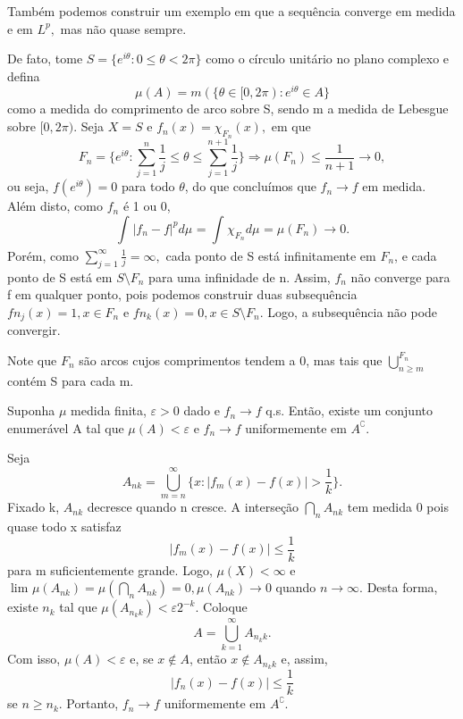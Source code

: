 \documentclass[measure_theory.tex]{subfiles}
\begin{document}
\begin{example}
	Também podemos construir um exemplo em que a sequência converge em medida e em \(L^{p},\) mas não quase sempre.

	De fato, tome \(S = \{e^{i\theta }: 0 \leq \theta < 2\pi \}\) como o círculo unitário no plano complexo e defina
	\[
		\mu (A) = m(\{\theta \in [0, 2\pi ): e^{i\theta }\in A\}
	\]
	como a medida do comprimento de arco sobre S, sendo m a medida de Lebesgue sobre \([0, 2\pi ).\) Seja \(X = S\) e \(f_{n}(x) = \chi_{F_{n}}(x),\) em que
	\[
		F_{n} = \biggl\{e^{i\theta }: \sum\limits_{j=1}^{n}\frac{1}{j} \leq \theta \leq \sum\limits_{j=1}^{n+1}\frac{1}{j}\biggr\} \Rightarrow \mu (F_{n}) \leq \frac{1}{n+1}\to 0,
	\]
	ou seja, \(f(e^{i\theta }) = 0\) para todo \(\theta \), do que concluímos que \(f_{n}\to f\) em medida. Além disto, como \(f_{n}\) é 1 ou 0,
	\[
		\int_{}|f_{n}-f|^{p} d\mu_{} = \int_{}\chi_{F_{n}} d\mu_{} = \mu (F_{n})\to 0.
	\]
	Porém, como \(\sum\limits_{j=1}^{\infty}\frac{1}{j} = \infty,\) cada ponto de S está infinitamente em \(F_{n}\), e cada ponto de S está em \(S\setminus{F_{n}}\) para uma infinidade de n. Assim,
	\(f_{n}\) não converge para f em qualquer ponto, pois podemos construir duas subsequência \(fn_{j}(x) = 1, x\in F_{n}\) e \(fn_{k}(x) = 0, x\in S\setminus{F_{n}}.\) Logo, a subsequência não pode convergir.

	Note que \(F_{n}\) são arcos cujos comprimentos tendem a 0, mas tais que \(\bigcup_{n\geq m}^{F_{n}}\) contém S para cada m.
\end{example}
\hypertarget{egorov}{
	\begin{theorem*}
		Suponha \(\mu \) medida finita, \(\varepsilon > 0\) dado e \(f_{n}\to f\) q.s. Então, existe um conjunto enumerável A tal que \(\mu (A) < \varepsilon \) e \(f_{n}\to f\) uniformemente em \(A ^{\complement}\).
	\end{theorem*}}
\begin{proof*}
	Seja
	\[
		A_{nk} = \bigcup_{m=n}^{\infty}\biggl\{x: |f_{m}(x) - f(x)| > \frac{1}{k}\biggr\}.
	\]
	Fixado k, \(A_{nk}\) decresce quando n cresce. A interseção \(\bigcap_{n}^{}A_{nk}\) tem medida 0 pois quase todo x satisfaz
	\[
		|f_{m}(x) - f(x)| \leq \frac{1}{k}
	\]
	para m suficientemente grande. Logo, \(\mu (X) < \infty\) e \(\lim_{} \mu (A_{nk}) = \mu (\bigcap_{n}^{}A_{nk}) = 0, \mu (A_{nk})\to 0\) quando \(n\to \infty\). Desta forma, existe \(n_{k}\) tal que
	\(\mu (A_{n_kk}) < \varepsilon 2^{-k}. \) Coloque
	\[
		A = \bigcup_{k=1}^{\infty}A_{n_kk}.
	\]
	Com isso, \(\mu (A) < \varepsilon \) e, se \(x\not\in A\), então \(x\not\in A_{n_{k}k}\) e, assim,
	\[
		|f_{n}(x) - f(x)| \leq \frac{1}{k}
	\]
	se \(n \geq n_{k}.\) Portanto, \(f_{n}\to f\) uniformemente em \(A ^{\complement}.\) \qedsymbol
\end{proof*}
\end{document}
